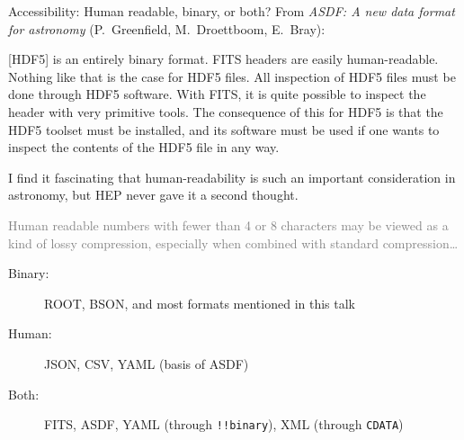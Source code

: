 \documentclass[aspectratio=169]{beamer}
\begin{document}
\begin{frame}{Accessibility: Human readable, binary, or both?}
\vspace{0.5 cm}
From {\it ASDF: A new data format for astronomy} {\small (P.\ Greenfield, M.\ Droettboom, E.\ Bray)}:

\begin{center}
\begin{minipage}{0.9\linewidth}
\scriptsize [HDF5] is an entirely binary format. FITS headers are easily human-readable. Nothing like that is the case for HDF5 files. All inspection of HDF5 files must be done through HDF5 software. With FITS, it is quite possible to inspect the header with very primitive tools. The consequence of this for HDF5 is that the HDF5 toolset must be installed, and its software must be used if one wants to inspect the contents of the HDF5 file in any way.
\end{minipage}
\end{center}

I find it fascinating that human-readability is such an important consideration in astronomy, but HEP never gave it a second thought.

\vspace{0.25 cm}

\textcolor{gray}{Human readable numbers with fewer than 4 or 8 characters may be viewed as a kind of lossy compression, especially when combined with standard compression\ldots}

\vspace{0.25 cm}

\begin{description}
\item[Binary:] ROOT, BSON, and most formats mentioned in this talk
\item[Human:] JSON, CSV, YAML (basis of ASDF)
\item[Both:] FITS, ASDF, YAML (through {\tt\small !!binary}), XML (through {\tt\small CDATA})
\end{description}
\end{frame}
\end{document}
